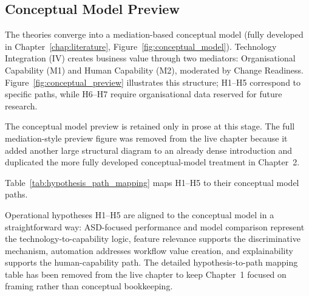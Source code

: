 \subsection{Conceptual Model Preview}

The theories converge into a mediation-based conceptual model (fully developed in Chapter~\ref{chap:literature}, Figure~\ref{fig:conceptual_model}). Technology Integration (IV) creates business value through two mediators: Organisational Capability (M1) and Human Capability (M2), moderated by Change Readiness. Figure~\ref{fig:conceptual_preview} illustrates this structure; H1--H5 correspond to specific paths, while H6--H7 require organisational data reserved for future research.


\label{fig:conceptual_preview}

\noindent The conceptual model preview is retained only in prose at this stage. The full mediation-style preview figure was removed from the live chapter because it added another large structural diagram to an already dense introduction and duplicated the more fully developed conceptual-model treatment in Chapter~2.

Table~\ref{tab:hypothesis_path_mapping} maps H1--H5 to their conceptual model paths.


Operational hypotheses H1--H5 are aligned to the conceptual model in a straightforward way: ASD-focused performance and model comparison represent the technology-to-capability logic, feature relevance supports the discriminative mechanism, automation addresses workflow value creation, and explainability supports the human-capability path. The detailed hypothesis-to-path mapping table has been removed from the live chapter to keep Chapter~1 focused on framing rather than conceptual bookkeeping.

